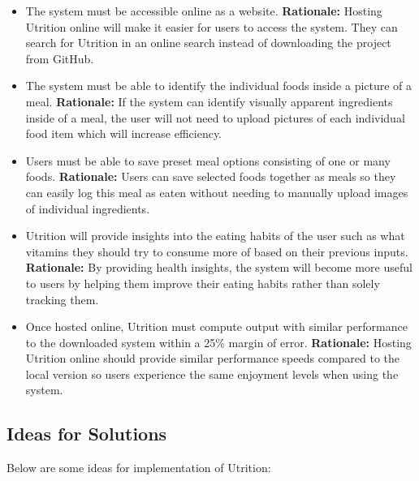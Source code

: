 \documentclass[12pt]{article}
\newcounter{FRCounter}
\newcommand{\FillFRNumber}{\textbf{FR\arabic{FRCounter}.} \stepcounter{FRCounter}}
\begin{document}
\begin{itemize}
	\item [\FillFRNumber] The system must be accessible online as a website.\newline
	\textbf{Rationale:} Hosting Utrition online will make it easier for users to access the system. They can search for Utrition in an online search instead of downloading the project from GitHub.
	
	\item [\FillFRNumber] The system must be able to identify the individual foods inside a picture of a meal.\newline
	\textbf{Rationale:} If the system can identify visually apparent ingredients inside of a meal, the user will not need to upload pictures of each individual food item which will increase efficiency.
	
	\item [\FillFRNumber] Users must be able to save preset meal options consisting of one or many foods.\newline
	\textbf{Rationale:} Users can save selected foods together as meals so they can easily log this meal as eaten without needing to manually upload images of individual ingredients.
	
	\item [\FillFRNumber] Utrition will provide insights into the eating habits of the user such as what vitamins they should try to consume more of based on their previous inputs.\newline
	\textbf{Rationale:} By providing health insights, the system will become more useful to users by helping them improve their eating habits rather than solely tracking them.
	
	\item [\textbf{PR10.}] Once hosted online, Utrition must compute output with similar performance to the downloaded system within a 25\% margin of error.\newline
	\textbf{Rationale:} Hosting Utrition online should provide similar performance speeds compared to the local version so users experience the same enjoyment levels when using the system.
	
\end{itemize}

\subsection{Ideas for Solutions}

Below are some ideas for implementation of Utrition:
\end{document}

